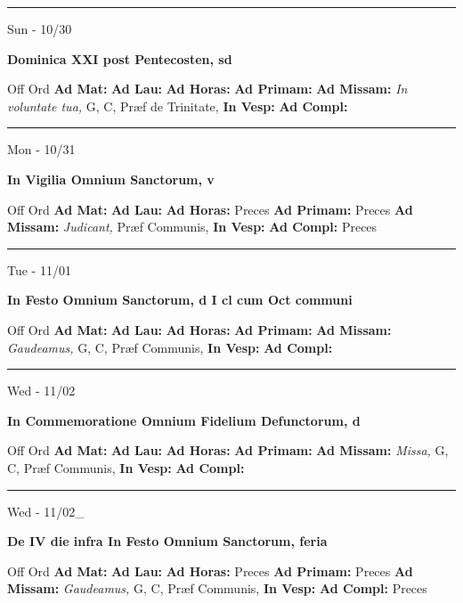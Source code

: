\documentclass[letterpaper, 10pt]{article}
\begin{document}
\hrule
\begin{center}
Sun - 10/30
\end{center}\textbf{ \large Dominica XXI post Pentecosten, \textnormal{\normalsize sd}}
\begin{justify}
Off Ord
\textbf{Ad Mat: }
\textbf{Ad Lau: }
\textbf{Ad Horas: }
\textbf{Ad Primam: }
\textbf{Ad Missam:} \textit{In voluntate tua, } G, C, Præf de Trinitate, 
\textbf{In Vesp: }
\textbf{Ad Compl: }\end{justify}



\hrule
\begin{center}
Mon - 10/31
\end{center}\textbf{ \large In Vigilia Omnium Sanctorum, \textnormal{\normalsize v}}
\begin{justify}
Off Ord
\textbf{Ad Mat: }
\textbf{Ad Lau: }
\textbf{Ad Horas: }Preces
\textbf{Ad Primam: }Preces
\textbf{Ad Missam:} \textit{Judicant, } Præf Communis, 
\textbf{In Vesp: }
\textbf{Ad Compl: }Preces\end{justify}



\hrule
\begin{center}
Tue - 11/01
\end{center}\textbf{ \large In Festo Omnium Sanctorum, \textnormal{\normalsize d I cl cum Oct communi}}
\begin{justify}
Off Ord
\textbf{Ad Mat: }
\textbf{Ad Lau: }
\textbf{Ad Horas: }
\textbf{Ad Primam: }
\textbf{Ad Missam:} \textit{Gaudeamus, } G, C, Præf Communis, 
\textbf{In Vesp: }
\textbf{Ad Compl: }\end{justify}



\hrule
\begin{center}
Wed - 11/02
\end{center}\textbf{ \large In Commemoratione Omnium Fidelium Defunctorum, \textnormal{\normalsize d}}
\begin{justify}
Off Ord
\textbf{Ad Mat: }
\textbf{Ad Lau: }
\textbf{Ad Horas: }
\textbf{Ad Primam: }
\textbf{Ad Missam:} \textit{Missa, } G, C, Præf Communis, 
\textbf{In Vesp: }
\textbf{Ad Compl: }\end{justify}



\hrule
\begin{center}
Wed - 11/02\_
\end{center}\textbf{ \large De IV die infra In Festo Omnium Sanctorum, \textnormal{\normalsize feria}}
\begin{justify}
Off Ord
\textbf{Ad Mat: }
\textbf{Ad Lau: }
\textbf{Ad Horas: }Preces
\textbf{Ad Primam: }Preces
\textbf{Ad Missam:} \textit{Gaudeamus, } G, C, Præf Communis, 
\textbf{In Vesp: }
\textbf{Ad Compl: }Preces\end{justify}
\end{document}
